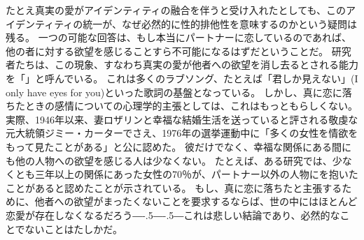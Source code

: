 \documentclass[paper=a4,book,openany]{jlreq}
\def\DDASH{―\kern-.5\zw―\kern-.5\zw―} %
\begin{document}
たとえ真実の愛がアイデンティティの融合を伴うと受け入れたとしても、このアイデンティティの統一が、なぜ必然的に性的排他性を意味するのかという疑問は残る。
一つの可能な回答は、もし本当にパートナーに恋しているのであれば、他の者に対する欲望を感じることすら不可能になるはずだということだ。
研究者たちは、この現象、すなわち真実の愛が他者への欲望を消し去るとされる能力を「」と呼んでいる。
これは多くのラブソング、たとえば「君しか見えない」(I only have eyes for you)といった歌詞の基盤となっている。
しかし、真に恋に落ちたときの感情についての心理学的主張としては、これはもっともらしくない。
実際、1946年以来、妻ロザリンと幸福な結婚生活を送っていると評される敬虔な元大統領ジミー・カーターでさえ、1976年の選挙運動中に「多くの女性を情欲をもって見たことがある」と公に認めた。
彼だけでなく、幸福な関係にある間にも他の人物への欲望を感じる人は少なくない。
たとえば、ある研究では、少なくとも三年以上の関係にあった女性の70％が、パートナー以外の人物にを抱いたことがあると認めたことが示されている\citep{barnhart16:_women_exper_feelin_attrac_someon}。
もし、真に恋に落ちたと主張するために、他者への欲望がまったくないことを要求するならば、世の中にはほとんど恋愛が存在しなくなるだろう{\DDASH}これは悲しい結論であり、必然的なことでないことはたしかだ。
\end{document}
